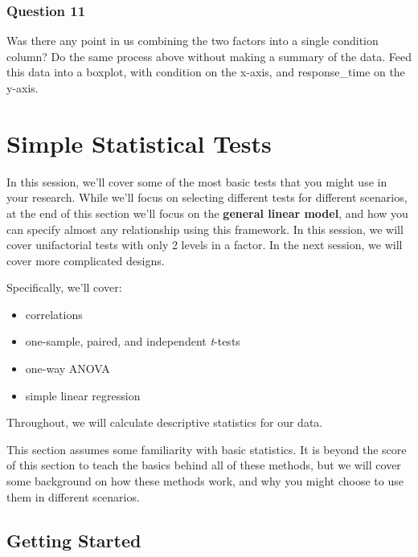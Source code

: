 \documentclass[
]{book}
\providecommand{\tightlist}{%
  \setlength{\itemsep}{0pt}\setlength{\parskip}{0pt}}
\begin{document}
\hypertarget{question-11-1}{%
\subsection{Question 11}\label{question-11-1}}

Was there any point in us combining the two factors into a single condition column? Do the same process above without making a summary of the data. Feed this data into a boxplot, with condition on the x-axis, and response\_time on the y-axis.

\hypertarget{simple-statistical-tests}{%
\chapter{Simple Statistical Tests}\label{simple-statistical-tests}}

In this session, we'll cover some of the most basic tests that you might use in your research. While we'll focus on selecting different tests for different scenarios, at the end of this section we'll focus on the \textbf{general linear model}, and how you can specify almost any relationship using this framework. In this session, we will cover unifactorial tests with only 2 levels in a factor. In the next session, we will cover more complicated designs.

Specifically, we'll cover:

\begin{itemize}
\tightlist
\item
  correlations
\item
  one-sample, paired, and independent \emph{t}-tests
\item
  one-way ANOVA
\item
  simple linear regression
\end{itemize}

Throughout, we will calculate descriptive statistics for our data.

This section assumes some familiarity with basic statistics. It is beyond the score of this section to teach the basics behind all of these methods, but we will cover some background on how these methods work, and why you might choose to use them in different scenarios.

\hypertarget{getting-started-3}{%
\section{Getting Started}\label{getting-started-3}}
\end{document}
